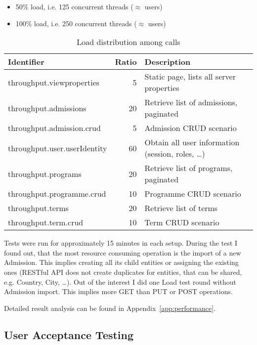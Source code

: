 	\begin{itemize}
		\item 50\% load, i.e. 125 concurrent threads ($\approx$ users)
		\item 100\% load, i.e. 250 concurrent threads ($\approx$ users)  
	\end{itemize}
	
	\begin{table}[h]\centering
	 	\begin{minipage}{12.9cm}
		\begin{tabular}{l|r|p{5.7cm}}
		\hline
		Identifier & Ratio & Description\\
		\hline
		throughput.viewproperties &	5 & Static page, lists all server properties \\
		throughput.admissions & 20 & Retrieve list of admissions, paginated \\
		throughput.admission.crud & 5 & Admission CRUD scenario \\
		throughput.user.userIdentity & 60 & Obtain all user information (session, roles, \ldots) \\
		throughput.programs & 20 & Retrieve list of programs, paginated \\
		throughput.programme.crud & 10 & Programme CRUD scenario \\
		throughput.terms & 20 & Retrieve list of terms \\
		throughput.term.crud & 10 & Term CRUD scenario \\
		\end{tabular}
	    \renewcommand{\footnoterule}{}
	    \end{minipage}
	\caption{Load distribution among calls}
	\label{load_distribution}
	\end{table}
	
	Tests were run for approximately 15 minutes in each setup. During the test I found out, that the most resource
	consuming operation is the import of a new Admission. This implies creating all its child entities or assigning the
	existing ones (RESTful API does not create duplicates for entities, that can be shared, e.g. Country, City, \ldots).
	Out of the interest I did one Load test round without Admission import. This implies more GET than PUT or POST
	operations.
	
	Detailed result analysis can be found in Appendix~\ref{app:performance}.
	
	\subsection{User Acceptance Testing}
	

